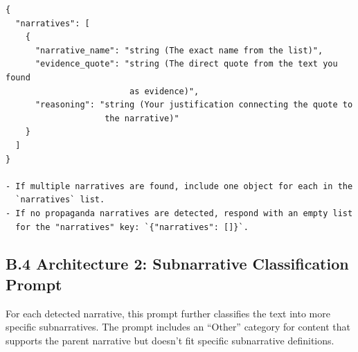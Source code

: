\begin{tcolorbox}[breakable, colback=gray!5, colframe=gray!75!black, title=Narrative System Prompt (Structure)]
\begin{verbatim}
{
  "narratives": [
    {
      "narrative_name": "string (The exact name from the list)",
      "evidence_quote": "string (The direct quote from the text you found 
                         as evidence)",
      "reasoning": "string (Your justification connecting the quote to 
                    the narrative)"
    }
  ]
}

- If multiple narratives are found, include one object for each in the 
  `narratives` list.
- If no propaganda narratives are detected, respond with an empty list 
  for the "narratives" key: `{"narratives": []}`.
\end{verbatim}
\end{tcolorbox}

\subsection{B.4 Architecture 2: Subnarrative Classification Prompt}
\label{app:b4-prompt-subnarrative}

For each detected narrative, this prompt further classifies the text into more specific subnarratives. The prompt includes an ``Other'' category for content that supports the parent narrative but doesn't fit specific subnarrative definitions.

